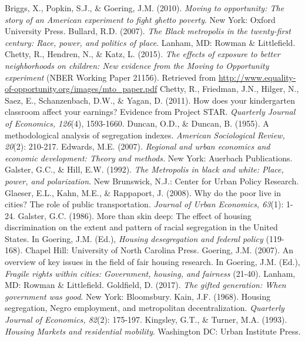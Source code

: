 \documentclass[paper=letter, fontsize=12pt]{scrartcl} %
\begin{document}
\begin{thebibliography}{9}
Briggs, X., Popkin, S.J., \& Goering, J.M. (2010). \textit{Moving to opportunity: The story of an American experiment to fight ghetto poverty}. New York: Oxford University Press.
Bullard, R.D. (2007). \textit{The Black metropolis in the twenty-first century: Race, power, and politics of place}. Lanham, MD: Rowman \& Littlefield.
Chetty, R., Hendren, N., \& Katz, L. (2015). \textit{The effects of exposure to better neighborhoods on children: New evidence from the Moving to Opportunity experiment} (NBER Working Paper 21156). Retrieved from \href{http://www.equality-of-opportunity.org/images/mto_paper.pdf}{http://www.equality-of-opportunity.org/images/mto\_paper.pdf}
Chetty, R., Friedman, J.N., Hilger, N., Saez, E., Schanzenbach, D.W., \& Yagan, D. (2011). How does your kindergarten classroom affect your earnings? Evidence from Project STAR. \textit{Quarterly Journal of Economics, 126}(4), 1593-1660.
Duncan, O.D., \& Duncan, B. (1955). A methodological analysis of segregation indexes. \textit{American Sociological Review, 20}(2): 210-217.
Edwards, M.E. (2007). \textit{Regional and urban economics and economic development: Theory and methods.} New York: Auerbach Publications.
Galster, G.C., \& Hill, E.W. (1992). \textit{The Metropolis in black and white: Place, power, and polarization}. New Brunswick, N.J.: Center for Urban Policy Research.
Glaeser, E.L., Kahn, M.E., \& Rappaport, J. (2008). Why do the poor live in cities? The role of public transportation. \textit{Journal of Urban Economics, 63}(1): 1-24.
Galster, G.C. (1986). More than skin deep: The effect of housing discrimination on the extent and pattern of racial segregation in the United States. In Goering, J.M. (Ed.), \textit{Housing desegregation and federal policy} (119-168). Chapel Hill: University of North Carolina Press.
Goering, J.M. (2007). An overview of key issues in the field of fair housing research. In Goering, J.M. (Ed.), \textit{Fragile rights within cities: Government, housing, and fairness} (21-40). Lanham, MD: Rowman \& Littlefield.
Goldfield, D. (2017). \textit{The gifted generation: When government was good}. New York: Bloomsbury.
Kain, J.F. (1968). Housing segregation, Negro employment, and metropolitan decentralization. \textit{Quarterly Journal of Economics, 82}(2): 175-197.
Kingsley, G.T., \& Turner, M.A. (1993). \textit{Housing Markets and residential mobility}. Washington DC: Urban Institute Press.

\end{thebibliography}
\end{document}
